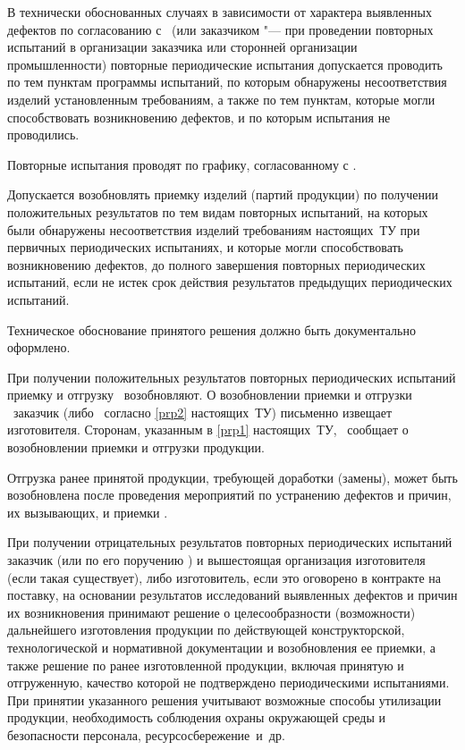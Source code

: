В технически обоснованных случаях в зависимости от характера выявленных дефектов по согласованию с \client \ (или заказчиком "--- при проведении повторных испытаний в организации заказчика или сторонней организации промышленности) повторные периодические испытания допускается проводить по тем пунктам программы испытаний, по которым обнаружены несоответствия изделий установленным требованиям, а также по тем пунктам, которые могли способствовать возникновению дефектов, и по которым испытания не проводились.

Повторные испытания проводят по графику, согласованному с \client.

Допускается возобновлять приемку изделий (партий продукции) по получении положительных результатов по тем видам повторных испытаний, на которых были обнаружены несоответствия изделий требованиям настоящих~ТУ при первичных периодических испытаниях, и которые могли способствовать возникновению дефектов, до полного завершения повторных периодических испытаний, если не истек срок действия результатов предыдущих периодических испытаний.

Техническое обоснование принятого решения должно быть документально оформлено.

\point
При получении положительных результатов повторных периодических испытаний приемку и отгрузку \dut \ возобновляют. О возобновлении приемки и отгрузки \dut \ заказчик (либо \client \ согласно  \ref{prp2} настоящих~ТУ) письменно извещает изготовителя. Сторонам, указанным в \ref{prp1} настоящих~ТУ, \client \ сообщает о возобновлении приемки и отгрузки продукции.

Отгрузка ранее принятой продукции, требующей доработки (замены), может быть возобновлена после проведения мероприятий по устранению дефектов и причин, их вызывающих, и приемки \client.

\point
\label{prx3}   
При получении отрицательных результатов повторных периодических испытаний заказчик (или по его поручению \client) и вышестоящая организация изготовителя (если такая существует), либо изготовитель, если это оговорено в контракте на поставку, на основании результатов исследований выявленных дефектов и причин их возникновения принимают решение о целесообразности (возможности) дальнейшего изготовления продукции по действующей конструкторской, технологической и нормативной документации и возобновления ее приемки, а также решение по ранее изготовленной продукции, включая принятую и отгруженную, качество которой не подтверждено периодическими испытаниями. При принятии указанного решения учитывают возможные способы утилизации продукции, необходимость соблюдения охраны окружающей среды и безопасности персонала, ресурсосбережение~и~др.

